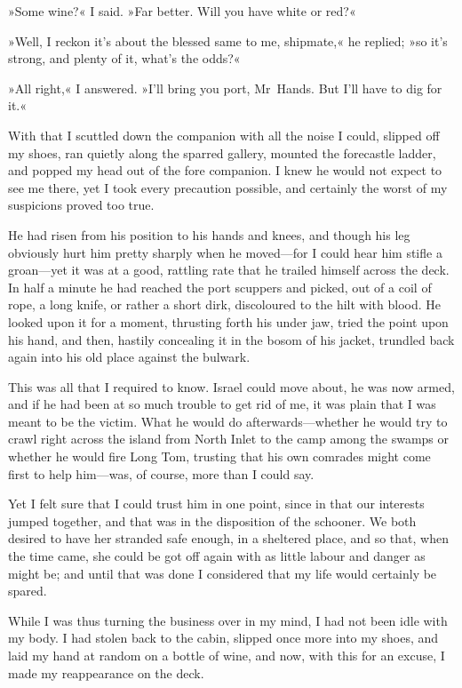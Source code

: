 »Some wine?« I said. »Far better. Will you have white or red?«

»Well, I reckon it's about the blessed same to me, shipmate,« he replied; »so it's strong, and plenty of it, what's the odds?«

»All right,« I answered. »I'll bring you port, Mr~Hands. But I'll have to dig for it.«

With that I scuttled down the companion with all the noise I could, slipped off my shoes, ran quietly along the sparred gallery, mounted the forecastle ladder, and popped my head out of the fore companion. I knew he would not expect to see me there, yet I took every precaution possible, and certainly the worst of my suspicions proved too true.

He had risen from his position to his hands and knees, and though his leg obviously hurt him pretty sharply when he moved—for I could hear him stifle a groan—yet it was at a good, rattling rate that he trailed himself across the deck. In half a minute he had reached the port scuppers and picked, out of a coil of rope, a long knife, or rather a short dirk, discoloured to the hilt with blood. He looked upon it for a moment, thrusting forth his under jaw, tried the point upon his hand, and then, hastily concealing it in the bosom of his jacket, trundled back again into his old place against the bulwark.

This was all that I required to know. Israel could move about, he was now armed, and if he had been at so much trouble to get rid of me, it was plain that I was meant to be the victim. What he would do afterwards—whether he would try to crawl right across the island from North Inlet to the camp among the swamps or whether he would fire Long Tom, trusting that his own comrades might come first to help him—was, of course, more than I could say.

Yet I felt sure that I could trust him in one point, since in that our interests jumped together, and that was in the disposition of the schooner. We both desired to have her stranded safe enough, in a sheltered place, and so that, when the time came, she could be got off again with as little labour and danger as might be; and until that was done I considered that my life would certainly be spared.

While I was thus turning the business over in my mind, I had not been idle with my body. I had stolen back to the cabin, slipped once more into my shoes, and laid my hand at random on a bottle of wine, and now, with this for an excuse, I made my reappearance on the deck.

